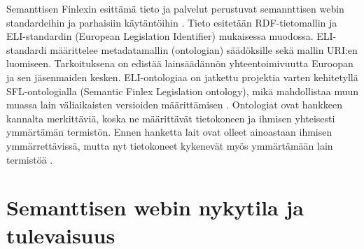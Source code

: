\documentclass[finnish, 12pt, a4paper, elec, utf8, pdfa, online]{aaltothesis}
\begin{document}
{Semanttisen Finlexin esittämä tieto ja palvelut perustuvat semannttisen webin standardeihin ja parhaisiin käytäntöihin \cite{finlex2}. Tieto esitetään RDF-tietomallin ja ELI-standardin (European Legislation Identifier) mukaisessa muodossa. ELI-standardi määrittelee metadatamallin (ontologian) säädöksille sekä mallin URI:en luomiseen. Tarkoituksena on edistää lainsäädännön yhteentoimivuutta Euroopan ja sen jäsenmaiden kesken. ELI-ontologiaa on jatkettu projektia varten kehitetyllä SFL-ontologialla (Semantic Finlex Legislation ontology), mikä mahdollistaa muun muassa lain väliaikaisten versioiden määrittämisen \cite{finlex3}. Ontologiat ovat hankkeen kannalta merkittäviä, koska ne määrittävät tietokoneen ja ihmisen yhteisesti ymmärtämän termistön. Ennen hanketta lait ovat olleet ainoastaan ihmisen ymmärrettävissä, mutta nyt tietokoneet kykenevät myös ymmärtämään lain termistöä \cite{finlex}.


\clearpage
\section{Semanttisen webin nykytila ja tulevaisuus}






}
\end{document}
